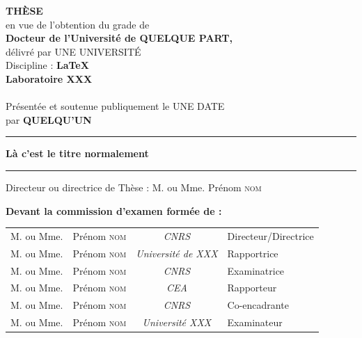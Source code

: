 \begin{center}
\noindent \Large \textbf{THÈSE} \\
\noindent \normalsize {en vue de l'obtention du grade de} \\
\noindent \large \textbf{Docteur de l'Université de QUELQUE PART, }\\
\noindent \large d\'{e}livr\'{e} par UNE UNIVERSITÉ \\
\noindent \normalsize Discipline : \textbf{\LaTeX}\\
\noindent \normalsize \textbf{Laboratoire XXX}\\
 \\
\noindent \normalsize {Présentée et soutenue publiquement le UNE DATE \\}
\noindent \large par \textbf{QUELQU'UN} \\
\hrule
{}
{\LARGE \textbf{Là c'est le titre normalement}}
\hrule
{}
\noindent \normalsize Directeur ou directrice de Thèse : M. ou Mme. Prénom \textsc{nom}  
\end{center}
\noindent \normalsize \textbf{Devant la commission d'examen formée de :}
\begin{center}
\noindent \normalsize 
\begin{tabular}{llcl}
    	M. ou Mme. & Prénom \textsc{nom} & \textit{CNRS} & Directeur/Directrice\\
    	M. ou Mme. & Prénom \textsc{nom} & \textit{Université de XXX} & Rapportrice\\
    	M. ou Mme. & Prénom \textsc{nom} & \textit{CNRS}& Examinatrice\\
      	M. ou Mme. & Prénom \textsc{nom} & \textit{CEA} & Rapporteur\\
      	M. ou Mme. & Prénom \textsc{nom}	& \textit{CNRS} & Co-encadrante\\
      	M. ou Mme. & Prénom \textsc{nom} & \textit{Université XXX} & Examinateur \\
\end{tabular}
\end{center}


